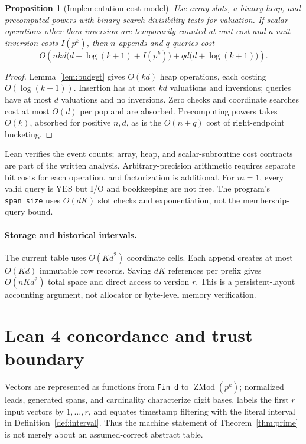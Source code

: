 \documentclass[11pt,a4paper]{article}
\theoremstyle{definition}
\theoremstyle{plain}
\newtheorem{proposition}{Proposition}
\begin{document}
\begin{proposition}[Implementation cost model]\label{prop:cost}
Use array slots, a binary heap, and precomputed powers with binary-search divisibility tests for
valuation. If scalar operations other than inversion are temporarily counted at unit cost and a
unit inversion costs $I(p^k)$, then $n$ appends and $q$ queries cost
\begin{equation}\label{eq:runtime}
 O\!\left(nkd\bigl(d+\log(k+1)+I(p^k)\bigr)
       +qd\bigl(d+\log(k+1)\bigr)\right).
\end{equation}
\end{proposition}
\begin{proof}
Lemma~\ref{lem:budget} gives $O(kd)$ heap operations, each costing $O(\log(k+1))$.
Insertion has at most $kd$ valuations and inversions; queries have at most $d$ valuations and no
inversions. Zero checks and coordinate searches cost at most $O(d)$ per pop and are absorbed.
Precomputing powers takes $O(k)$, absorbed for positive $n,d$, as is the $O(n+q)$ cost of
right-endpoint bucketing.
\end{proof}
Lean verifies the event counts; array, heap, and scalar-subroutine cost contracts are part of the
written analysis. Arbitrary-precision arithmetic requires separate bit costs for each operation,
and factorization is additional. For $m=1$, every valid query is YES but I/O and bookkeeping are
not free. The program's \texttt{span\_size} uses $O(dK)$ slot checks and exponentiation, not the
membership-query bound.

\paragraph{Storage and historical intervals.}
The current table uses $O(Kd^2)$ coordinate cells. Each append creates at most $O(Kd)$ immutable
row records. Saving $dK$ references per prefix gives $O(nKd^2)$ total space and direct access to
version $r$. This is a persistent-layout accounting argument, not allocator or byte-level memory
verification.

\section{Lean 4 concordance and trust boundary}
Vectors are represented as functions from \texttt{Fin d} to $\operatorname{ZMod}(p^k)$; normalized
leads, generated spans, and cardinality characterize digit bases.  labels
the first $r$ input vectors by $1,\ldots,r$, and  equates timestamp
filtering with the literal interval in Definition~\ref{def:interval}. Thus the machine statement
of Theorem~\ref{thm:prime} is not merely about an assumed-correct abstract table.
\end{document}
